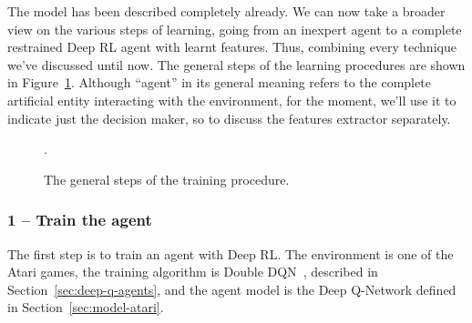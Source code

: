 The model has been described completely already. We can now take a broader
view on the various steps of learning, going from an inexpert agent to a
complete restrained Deep RL agent with learnt features. Thus, combining every
technique we've discussed until now. The general steps of the learning
procedures are shown in Figure~\ref{fig:training-steps}. Although ``agent'' in
its general meaning refers to the complete artificial entity interacting with
the environment, for the moment, we'll use it to indicate just the decision
maker, so to discuss the features extractor separately.

\begin{figure}
	\centering
	\caption{The general steps of the training procedure.}
	\label{fig:training-steps}.
\end{figure}

\subsubsection*{1 -- Train the agent}

The first step is to train an agent with Deep RL. The environment is one of
the Atari games, the training algorithm is Double DQN~\cite{bib:double-q},
described in Section~\ref{sec:deep-q-agents}, and the agent model is the Deep
Q-Network defined in Section~\ref{sec:model-atari}.

